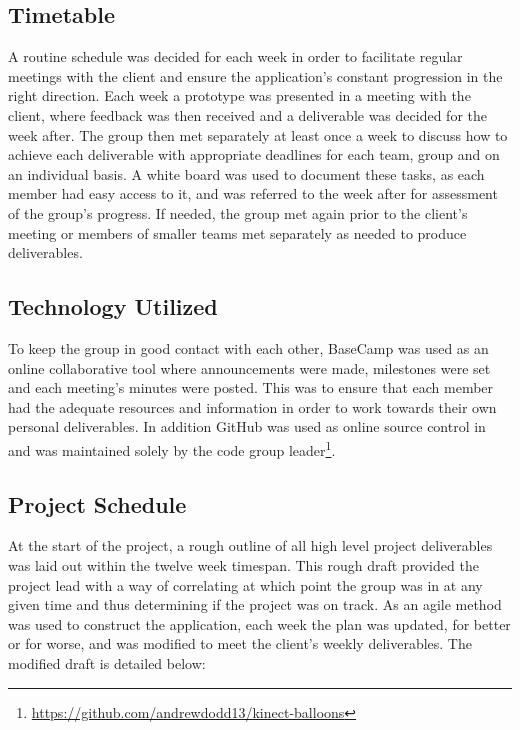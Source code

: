 \subsection{Timetable}
A routine schedule was decided for each week in order to facilitate regular meetings with the client and ensure the application's constant progression in the right direction. Each week a prototype was presented in a meeting with the client, where feedback was then received and a deliverable was decided for the week after. The group then met separately at least once a week to discuss how to achieve each deliverable with appropriate deadlines for each team, group and on an individual basis. A white board was used to document these tasks, as each member had easy access to it, and was referred to the week after for assessment of the group's progress. If needed, the group met again prior to the client's meeting or members of smaller teams met separately as needed to produce deliverables.

\subsection{Technology Utilized}
To keep the group in good contact with each other, BaseCamp was used as an online collaborative tool where announcements were made, milestones were set and each meeting's minutes were posted. This was to ensure that each member had the adequate resources and information in order to work towards their own personal deliverables. In addition GitHub was used as online source control in and was maintained solely by the code group leader\footnote{\url{https://github.com/andrewdodd13/kinect-balloons}}.

\clearpage{}

\subsection{Project Schedule}
At the start of the project, a rough outline of all high level project deliverables was laid out within the twelve week timespan. This rough draft provided the project lead with a way of correlating at which point the group was in at any given time and thus determining if the project was on track. As an agile method was used to construct the application, each week the plan was updated, for better or for worse, and was modified to meet the client's weekly deliverables. The modified draft is detailed below:

